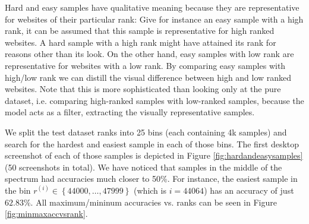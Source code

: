 Hard and easy samples have qualitative meaning because they are representative for websites of their particular rank: Give for instance an easy sample with a high rank, it can be assumed that this sample is representative for high ranked websites. A hard sample with a high rank might have attained its rank for reasons other than its look. On the other hand, easy samples with low rank are representative for websites with a low rank. By comparing easy samples with high/low rank we can distill the visual difference between high and low ranked websites. Note that this is more sophisticated than looking only at the pure dataset, i.e. comparing high-ranked samples with low-ranked samples, because the model acts as a filter, extracting the visually representative samples.

We split the test dataset ranks into 25 bins (each containing 4k samples) and search for the hardest and easiest sample in each of those bins. The first desktop screenshot of each of those samples is depicted in Figure \ref{fig:hardandeasysamples} (50 screenshots in total). We have noticed that samples in the middle of the spectrum had accuracies much closer to 50\%. For instance, the easiest sample in the bin $r^{(i)}\in{\left\{44000, \dots, 47999\right\}}$ (which is $i=44064$) has an accuracy of just $62.83\%$. All maximum/mininum accuracies vs. ranks can be seen in Figure \ref{fig:minmaxaccvsrank}.

